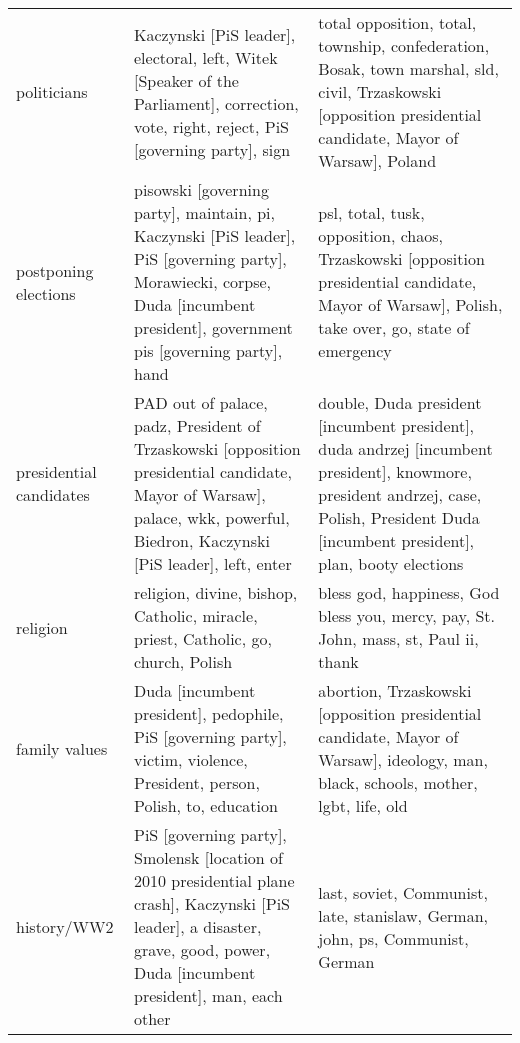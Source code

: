 \begin{tabular}{p{2cm}p{6cm}p{6cm}}
             politicians &                                          Kaczynski [PiS leader], electoral, left, Witek [Speaker of the Parliament], correction, vote, right, reject, PiS [governing party], sign &                                      total opposition, total, township, confederation, Bosak, town marshal, sld, civil, Trzaskowski [opposition presidential candidate, Mayor of Warsaw], Poland \\
    postponing elections &   pisowski [governing party], maintain, pi, Kaczynski [PiS leader], PiS [governing party], Morawiecki, corpse, Duda [incumbent president], government pis [governing party], hand &                                                 psl, total, tusk, opposition, chaos, Trzaskowski [opposition presidential candidate, Mayor of Warsaw], Polish, take over, go, state of emergency \\
 presidential candidates &       PAD out of palace, padz, President of Trzaskowski [opposition presidential candidate, Mayor of Warsaw], palace, wkk, powerful, Biedron, Kaczynski [PiS leader], left, enter &         double, Duda president [incumbent president], duda andrzej [incumbent president], knowmore, president andrzej, case, Polish, President Duda [incumbent president], plan, booty elections \\
                religion &                                                                                                 religion, divine, bishop, Catholic, miracle, priest, Catholic, go, church, Polish &                                                                                                              bless god, happiness, God bless you, mercy, pay, St. John, mass, st, Paul ii, thank \\
           family values &                                                          Duda [incumbent president], pedophile, PiS [governing party], victim, violence, President, person, Polish, to, education &                                                               abortion, Trzaskowski [opposition presidential candidate, Mayor of Warsaw], ideology, man, black, schools, mother, lgbt, life, old \\
             history/WW2 &  PiS [governing party], Smolensk [location of 2010 presidential plane crash], Kaczynski [PiS leader], a disaster, grave, good, power, Duda [incumbent president], man, each other &                                                                                                                    last, soviet, Communist, late, stanislaw, German, john, ps, Communist, German \\

\end{tabular}
